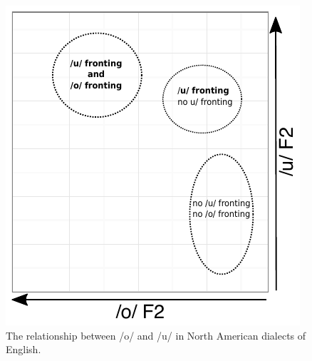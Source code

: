 \documentclass[12pt]{article}
\begin{document}
\begin{figure}[!htbp]
\centering
\includegraphics[scale=0.8]{owuwANAE.pdf}
\caption{The relationship between /o/ and /u/ in North American dialects of English.}
\end{figure}
\end{document}
